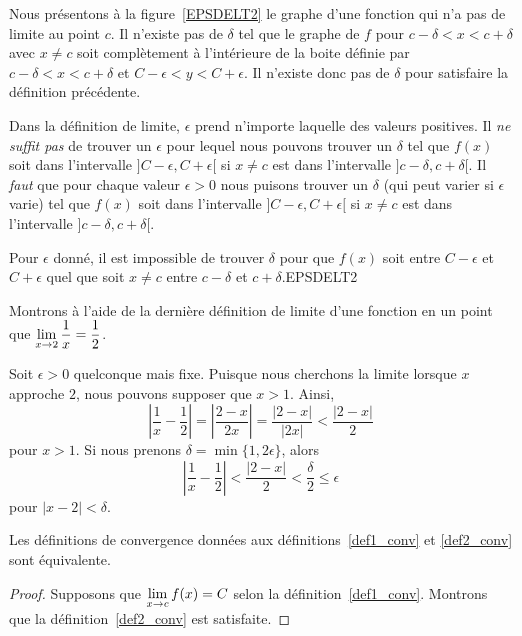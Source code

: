 {Nous présentons à la figure~\ref{EPSDELT2} le graphe d'une fonction
qui n'a pas de limite au point $c$.  Il n'existe pas de $\delta$ tel
que le graphe de $f$ pour $c-\delta < x < c+\delta$ avec $x \neq c$
soit complètement à l'intérieure de la boite définie par 
$c-\delta < x < c+\delta$ et $C-\epsilon < y < C+\epsilon$.  Il
n'existe donc pas de $\delta$ pour satisfaire la définition
précédente.

Dans la définition de limite, $\epsilon$ prend n'importe laquelle des
valeurs positives.  Il {\em ne suffit pas} de trouver un $\epsilon$
pour lequel nous pouvons trouver un $\delta$ tel que $f(x)$ soit dans
l'intervalle $]C-\epsilon, C+\epsilon[$ si $x \neq c$ est dans
l'intervalle $]c-\delta , c+\delta[$.  Il {\em faut} que pour chaque
valeur $\epsilon>0$ nous puisons trouver un $\delta$ (qui peut varier si
$\epsilon$ varie) tel que $f(x)$ soit dans l'intervalle
$]C-\epsilon, C+\epsilon[$ si $x \neq c$ est dans l'intervalle
$]c-\delta , c+\delta[$.

{Pour $\epsilon$ donné, il est impossible de trouver $\delta$ pour que
$f(x)$ soit entre $C-\epsilon$ et $C+\epsilon$ quel que soit $x \neq c$
entre $c-\delta$ et $c+\delta$.}{EPSDELT2}

\begin{egg}
Montrons à l'aide de la dernière définition de limite d'une fonction
en un point que
$\displaystyle \lim_{x\rightarrow 2} \frac{1}{x} = \frac{1}{2}$.

Soit $\epsilon >0$ quelconque mais fixe.  Puisque nous cherchons la
limite lorsque $x$ approche $2$, nous pouvons supposer que $x>1$.
Ainsi,
\[ 
\left|\frac{1}{x} - \frac{1}{2}\right| = \left| \frac{2-x}{2x} \right|
= \frac{|2-x|}{|2x|} < \frac{|2-x|}{2}
\]
pour $x>1$.  Si nous prenons $\delta = \min\{1, 2\epsilon\}$, alors
\[
\left|\frac{1}{x} - \frac{1}{2}\right| < \frac{|2-x|}{2}
< \frac{\delta}{2} \leq \epsilon
\]
pour $|x-2|<\delta$.
\end{egg}

\begin{prop}
Les définitions de convergence données aux définitions~\ref{def1_conv}
et \ref{def2_conv} sont équivalente.
\end{prop}

\begin{proof}
 Supposons que $\displaystyle \lim_{x\rightarrow c} f(x) = C$
selon la définition~\ref{def1_conv}.  Montrons que la
définition~\ref{def2_conv} est satisfaite.


\end{proof}}
